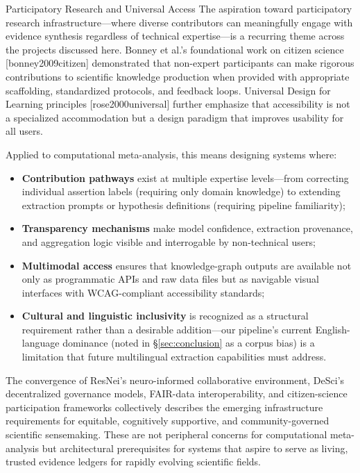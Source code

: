 \documentclass[
  ignorenonframetext,
]{beamer}
\providecommand{\citep}[1]{[#1]}
\begin{document}
\begin{frame}[allowframebreaks]{Participatory Research and Universal
Access}
\protect{}\label{participatory-research-and-universal-access}
The aspiration toward participatory research infrastructure---where
diverse contributors can meaningfully engage with evidence synthesis
regardless of technical expertise---is a recurring theme across the
projects discussed here. Bonney et al.'s foundational work on citizen
science \citep{bonney2009citizen} demonstrated that non-expert
participants can make rigorous contributions to scientific knowledge
production when provided with appropriate scaffolding, standardized
protocols, and feedback loops. Universal Design for Learning principles
\citep{rose2000universal} further emphasize that accessibility is not a
specialized accommodation but a design paradigm that improves usability
for all users.

Applied to computational meta-analysis, this means designing systems
where:

\begin{itemize}
  \item \textbf{Contribution pathways} exist at multiple expertise levels---from correcting individual assertion labels (requiring only domain knowledge) to extending extraction prompts or hypothesis definitions (requiring pipeline familiarity);
  \item \textbf{Transparency mechanisms} make model confidence, extraction provenance, and aggregation logic visible and interrogable by non-technical users;
  \item \textbf{Multimodal access} ensures that knowledge-graph outputs are available not only as programmatic APIs and raw data files but as navigable visual interfaces with WCAG-compliant accessibility standards;
  \item \textbf{Cultural and linguistic inclusivity} is recognized as a structural requirement rather than a desirable addition---our pipeline's current English-language dominance (noted in \S\ref{sec:conclusion} as a corpus bias) is a limitation that future multilingual extraction capabilities must address.
\end{itemize}

The convergence of ResNei's neuro-informed collaborative environment,
DeSci's decentralized governance models, FAIR-data interoperability, and
citizen-science participation frameworks collectively describes the
emerging infrastructure requirements for equitable, cognitively
supportive, and community-governed scientific sensemaking. These are not
peripheral concerns for computational meta-analysis but architectural
prerequisites for systems that aspire to serve as living, trusted
evidence ledgers for rapidly evolving scientific fields.

\FloatBarrier
\end{frame}
\end{document}
